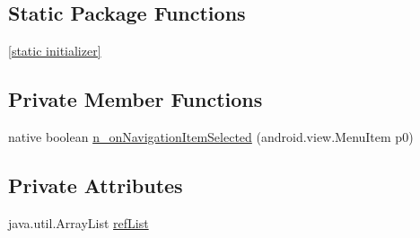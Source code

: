 \subsection*{Static Package Functions}
\begin{CompactItemize}
\item 
\hyperlink{classmono_1_1android_1_1support_1_1design_1_1widget_1_1_navigation_view___on_navigation_item_selected_listener_implementor_2b10f2fd1f4e5bb964e27fd3d4cc1f64}{\mbox{[}static initializer\mbox{]}}
\end{CompactItemize}
\subsection*{Private Member Functions}
\begin{CompactItemize}
\item 
native boolean \hyperlink{classmono_1_1android_1_1support_1_1design_1_1widget_1_1_navigation_view___on_navigation_item_selected_listener_implementor_356b61d1d75619cfe60faafab7600233}{n\_\-onNavigationItemSelected} (android.view.MenuItem p0)
\end{CompactItemize}
\subsection*{Private Attributes}
\begin{CompactItemize}
\item 
java.util.ArrayList \hyperlink{classmono_1_1android_1_1support_1_1design_1_1widget_1_1_navigation_view___on_navigation_item_selected_listener_implementor_6beed58a796622828950e4dab943d024}{refList}
\end{CompactItemize}


